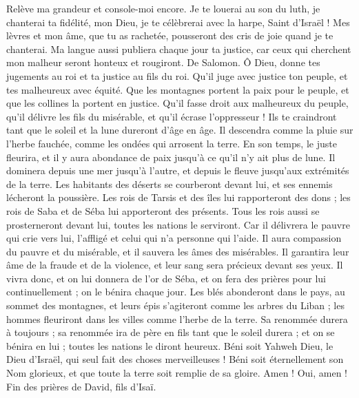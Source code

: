 \begin{multicols}{2}
Relève ma grandeur et console-moi encore.
Je te louerai au son du luth, je chanterai ta fidélité, mon Dieu, je te célèbrerai avec la harpe, Saint d'Israël !
Mes lèvres et mon âme, que tu as rachetée, pousseront des cris de joie quand je te chanterai.
Ma langue aussi publiera chaque jour ta justice, car ceux qui cherchent mon malheur seront honteux et rougiront.
\VerseOne{}De Salomon. Ô Dieu, donne tes jugements au roi et ta justice au fils du roi.
Qu'il juge avec justice ton peuple, et tes malheureux avec équité.
Que les montagnes portent la paix pour le peuple, et que les collines la portent en justice.
Qu'il fasse droit aux malheureux du peuple, qu'il délivre les fils du misérable, et qu'il écrase l'oppresseur !
Ils te craindront tant que le soleil et la lune dureront d'âge en âge.
Il descendra comme la pluie sur l'herbe fauchée, comme les ondées qui arrosent la terre.
En son temps, le juste fleurira, et il y aura abondance de paix jusqu'à ce qu'il n'y ait plus de lune.
Il dominera depuis une mer jusqu'à l'autre, et depuis le fleuve jusqu'aux extrémités de la terre.
Les habitants des déserts se courberont devant lui, et ses ennemis lécheront la poussière.
Les rois de Tarsis et des îles lui rapporteront des dons ; les rois de Saba et de Séba lui apporteront des présents.
Tous les rois aussi se prosterneront devant lui, toutes les nations le serviront.
Car il délivrera le pauvre qui crie vers lui, l'affligé et celui qui n'a personne qui l'aide.
Il aura compassion du pauvre et du misérable, et il sauvera les âmes des misérables.
Il garantira leur âme de la fraude et de la violence, et leur sang sera précieux devant ses yeux.
Il vivra donc, et on lui donnera de l'or de Séba, et on fera des prières pour lui continuellement ; on le bénira chaque jour.
Les blés abonderont dans le pays, au sommet des montagnes, et leurs épis s'agiteront comme les arbres du Liban ; les hommes fleuriront dans les villes comme l'herbe de la terre.
Sa renommée durera à toujours ; sa renommée ira de père en fils tant que le soleil durera ; et on se bénira en lui ; toutes les nations le diront heureux.
Béni soit Yahweh Dieu, le Dieu d'Israël, qui seul fait des choses merveilleuses !
Béni soit éternellement son Nom glorieux, et que toute la terre soit remplie de sa gloire. Amen ! Oui, amen !
Fin des prières de David, fils d'Isaï.

\end{multicols}
